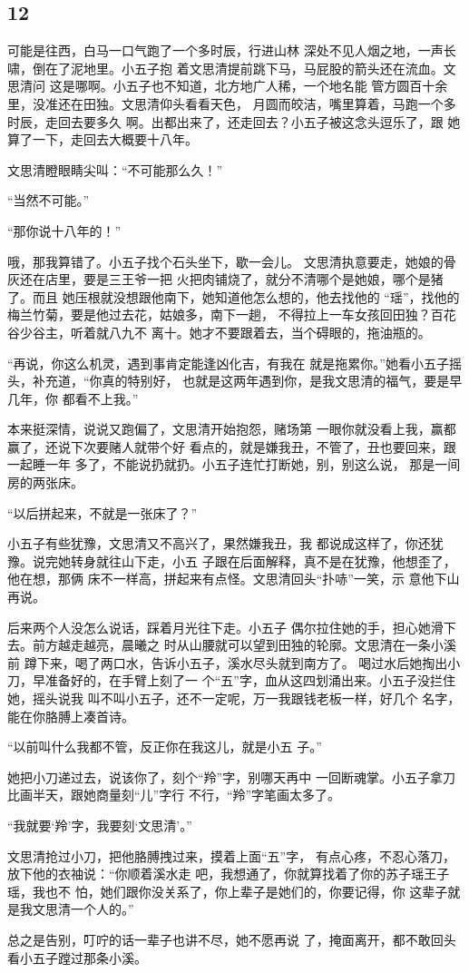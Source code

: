 {\centering\subsection{12}}

可能是往西，白马一口气跑了一个多时辰，行进山林
深处不见人烟之地，一声长啸，倒在了泥地里。小五子抱
着文思清提前跳下马，马屁股的箭头还在流血。文思清问
这是哪啊。小五子也不知道，北方地广人稀，一个地名能
管方圆百十余里，没准还在田独。文思清仰头看看天色，
月圆而皎洁，嘴里算着，马跑一个多时辰，走回去要多久
啊。出都出来了，还走回去？小五子被这念头逗乐了，跟
她算了一下，走回去大概要十八年。

文思清瞪眼睛尖叫：“不可能那么久！”

“当然不可能。”

“那你说十八年的！”

哦，那我算错了。小五子找个石头坐下，歇一会儿。
文思清执意要走，她娘的骨灰还在店里，要是三王爷一把
火把肉铺烧了，就分不清哪个是她娘，哪个是猪了。而且
她压根就没想跟他南下，她知道他怎么想的，他去找他的
“瑶”，找他的梅兰竹菊，要是他过去花，姑娘多，南下一趟，
不得拉上一车女孩回田独？百花谷少谷主，听着就八九不
离十。她才不要跟着去，当个碍眼的，拖油瓶的。

“再说，你这么机灵，遇到事肯定能逢凶化吉，有我在
就是拖累你。”她看小五子摇头，补充道，“你真的特别好，
也就是这两年遇到你，是我文思清的福气，要是早几年，你
都看不上我。”

本来挺深情，说说又跑偏了，文思清开始抱怨，赌场第
一眼你就没看上我，赢都赢了，还说下次要赌人就带个好
看点的，就是嫌我丑，不管了，丑也要回来，跟一起睡一年
多了，不能说扔就扔。小五子连忙打断她，别，别这么说，
那是一间房的两张床。

“以后拼起来，不就是一张床了？”

小五子有些犹豫，文思清又不高兴了，果然嫌我丑，我
都说成这样了，你还犹豫。说完她转身就往山下走，小五
子跟在后面解释，真不是在犹豫，他想歪了，他在想，那俩
床不一样高，拼起来有点怪。文思清回头“扑哧”一笑，示
意他下山再说。

后来两个人没怎么说话，踩着月光往下走。小五子
偶尔拉住她的手，担心她滑下去。前方越走越亮，晨曦之
时从山腰就可以望到田独的轮廓。文思清在一条小溪前
蹲下来，喝了两口水，告诉小五子，溪水尽头就到南方了。
喝过水后她掏出小刀，早准备好的，在手臂上刻了一
个“五”字，血从这四划涌出来。小五子没拦住她，摇头说我
叫不叫小五子，还不一定呢，万一我跟钱老板一样，好几个
名字，能在你胳膊上凑首诗。

“以前叫什么我都不管，反正你在我这儿，就是小五
子。”

她把小刀递过去，说该你了，刻个“羚”字，别哪天再中
一回断魂掌。小五子拿刀比画半天，跟她商量刻“儿”字行
不行，“羚”字笔画太多了。

“我就要‘羚’字，我要刻‘文思清’。”

文思清抢过小刀，把他胳膊拽过来，摸着上面“五”字，
有点心疼，不忍心落刀，放下他的衣袖说：“你顺着溪水走
吧，我想通了，你就算找着了你的苏子瑶王子瑶，我也不
怕，她们跟你没关系了，你上辈子是她们的，你要记得，你
这辈子就是我文思清一个人的。”

总之是告别，叮咛的话一辈子也讲不尽，她不愿再说
了，掩面离开，都不敢回头看小五子蹚过那条小溪。

\newpage